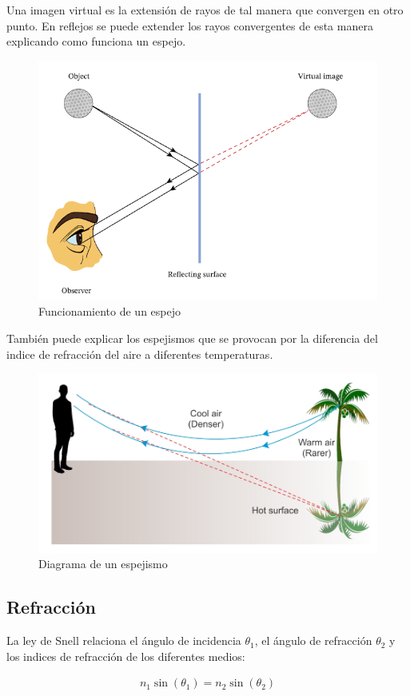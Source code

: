 \documentclass{article}
\begin{document}
Una imagen virtual es la extensión de rayos de tal manera que convergen en otro punto. En reflejos se puede extender los rayos convergentes de esta manera explicando como funciona un espejo.

\begin{figure}[H]
	\centering
	\includegraphics[width=0.65\linewidth]{Figuras/Mirror}
	\caption{Funcionamiento de un espejo}
	\label{fig:mirror}
\end{figure}

También puede explicar los espejismos que se provocan por la diferencia del indice de refracción del aire a diferentes temperaturas.

\begin{figure}[H]
	\centering
	\includegraphics[width=0.75\linewidth]{Figuras/Mirage}
	\caption{Diagrama de un espejismo}
	\label{fig:mirage}
\end{figure}



\subsection{Refracción}

La ley de Snell relaciona el ángulo de incidencia $\theta_1$, el ángulo de refracción $\theta_2$ y los indices de refracción de los diferentes medios:

\begin{align*}
	n_1\sin(\theta_1) = n_2\sin(\theta_2)
\end{align*}
\end{document}
